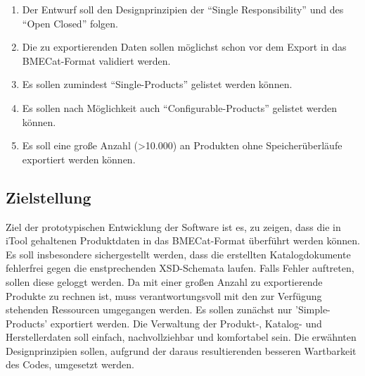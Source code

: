 \begin{enumerate}[noitemsep]
\begin{itemize}[noitemsep]
\begin{itemize}[noitemsep]
				\end{itemize}
			\end{itemize}
		\item Der Entwurf soll den Designprinzipien der \enquote{Single Responsibility} und des \enquote{Open Closed} folgen.
		\item Die zu exportierenden Daten sollen möglichst schon vor dem Export in das BMECat-Format validiert werden.
		\item Es sollen zumindest \enquote{Single-Products} gelistet werden können.
		\item Es sollen nach Möglichkeit auch \enquote{Configurable-Products} gelistet werden können.
		\item Es soll eine große Anzahl (\textgreater 10.000) an Produkten ohne Speicherüberläufe exportiert werden können.
		\end{enumerate}
				 

		
		\subsection{Zielstellung}
		
		Ziel der prototypischen Entwicklung der Software ist es, zu zeigen, dass die in iTool gehaltenen Produktdaten in das BMECat-Format überführt werden können. Es soll insbesondere sichergestellt werden, dass die erstellten Katalogdokumente fehlerfrei gegen die enstprechenden XSD-Schemata laufen. Falls Fehler auftreten, sollen diese geloggt werden. Da mit einer großen Anzahl zu exportierende Produkte zu rechnen ist, muss verantwortungsvoll mit den zur Verfügung stehenden Ressourcen umgegangen werden. Es sollen zunächst nur 'Simple-Products' exportiert werden. Die Verwaltung der Produkt-, Katalog- und Herstellerdaten soll einfach, nachvollziehbar und komfortabel sein. Die erwähnten Designprinzipien sollen, aufgrund der daraus resultierenden besseren Wartbarkeit des Codes, umgesetzt werden.
		

